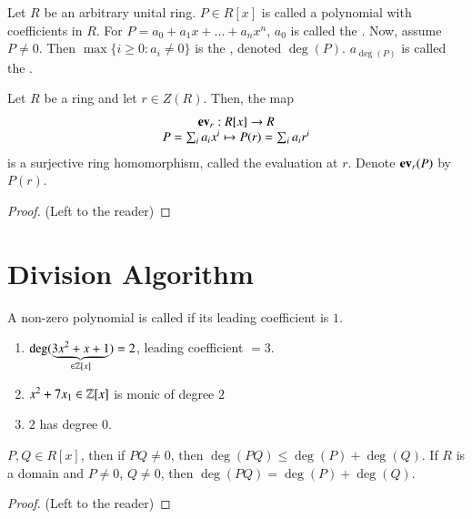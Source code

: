 \documentclass[12pt, a4paper, oneside, openright, titlepage]{book}
\begin{document}
\begin{defn}
    Let $R$ be an arbitrary unital ring. $P \in R[x]$ is called a polynomial with coefficients in $R$. For $P = a_0+a_1x+...+a_nx^n$, $a_0$ is called the . Now, assume $P \neq 0$. Then $\max\{i\geq 0:a_i \neq0\}$ is the , denoted $\deg(P)$. $a_{\deg(P)}$ is called the .
\end{defn}

\begin{defn}
    Let $R$ be a ring and let $r \in Z(R)$. Then, the map \begin{equation}
        \begin{array}{c} \operatorname{\bf{ev}}_r:R[x]\rightarrow R \\ P = \sum_ia_ix^i \mapsto P(r) = \sum_ia_ir^i \end{array}
    \end{equation}
    is a surjective ring homomorphism, called the evaluation at $r$. Denote $\operatorname{\bf{ev}}_r(P)$ by $P(r)$.
    \begin{proof}
        (Left to the reader)
    \end{proof}
\end{defn}

\section{\textsection Division Algorithm}

\begin{defn}
    A non-zero polynomial is called  if its leading coefficient is $1$.
\end{defn}

\begin{eg}
    \leavevmode
    \begin{enumerate}
        \item $\deg(\underbrace{3x^2+x+1}_{\in\mathbb Z[x]}) = 2$, leading coefficient $= 3$.
        \item $x^2+7x_1 \in \mathbb Z[x]$ is monic of degree $2$
        \item $2$ has degree $0$.
    \end{enumerate}
\end{eg}

\begin{rmk}
    $P,Q \in R[x]$, then if $PQ \neq 0$, then $\deg(PQ) \leq \deg(P) + \deg(Q)$. If $R$ is a domain and $P \neq 0$, $Q \neq 0$, then $\deg(PQ) = \deg(P) + \deg(Q)$.
    \begin{proof}
        (Left to the reader)
    \end{proof}
\end{rmk}
\end{document}
